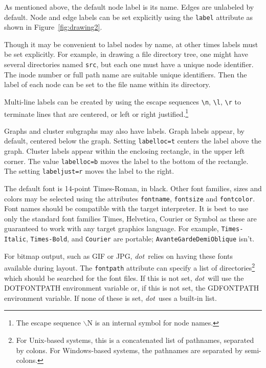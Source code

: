 \documentclass[11pt]{article}
\def\dot{{\it dot}}
\begin{document}
As mentioned above, the default node label is its name.
Edges are unlabeled by default.
Node and edge labels can be set explicitly using the {\tt label}
attribute as shown in 
Figure~\ref{fig:drawing2}.

Though it may be convenient to label nodes by name, at other times
labels must be set explicitly.  For example, in drawing a file
directory tree, one might have several directories named {\tt src},
but each one must have a unique node identifier.
The inode number or full path name are suitable unique identifiers.
Then the label of each node can be set to the file name within
its directory. 

Multi-line labels can be created by using the escape 
sequences \verb"\n", \verb"\l", \verb"\r" to terminate
lines that are centered, or left or right justified.\footnote{The escape
sequence $\backslash$N is an internal symbol for node names.}


Graphs and cluster subgraphs may also have labels. Graph labels
appear, by default, centered below the graph. Setting {\tt labelloc=t}
centers the label above the graph. Cluster labels appear within the
enclosing rectangle, in the upper left corner. The value {\tt labelloc=b}
moves the label to the bottom of the rectangle. The setting
{\tt labeljust=r} moves the label to the right.

The default font is 14-point Times-Roman, in black.
Other font families, sizes and colors may be selected using the
attributes {\tt fontname}, {\tt fontsize} and {\tt fontcolor}.
Font names should be compatible with the target interpreter.
It is best to use only the standard font families
Times, Helvetica, Courier or Symbol as these are guaranteed to work
with any target graphics language.
For example, \verb"Times-Italic", \verb"Times-Bold", and \verb"Courier"
are portable; {\tt AvanteGarde\-DemiOblique} isn't.

For bitmap output, such as GIF or JPG, \dot\ relies on having these
fonts available during layout. The {\tt fontpath} attribute can
specify a list of directories\footnote{For Unix-based systems, this is
a concatenated list of pathnames, separated by colons. For Windows-based
systems, the pathnames are separated by semi-colons.} which should be 
searched for the font files. If this is not set, 
\dot\ will use the DOTFONTPATH environment variable or, if this is not
set, the GDFONTPATH environment variable. If none of these is set, \dot\
uses a built-in list.
\end{document}
